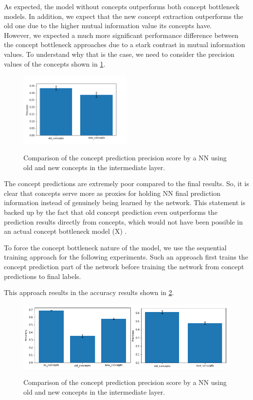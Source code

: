 As expected, the model without concepts outperforms both concept bottleneck models. 
In addition, we expect that the new concept extraction outperforms the old one due to the higher mutual information value its concepts have. \\
However, we expected a much more significant performance difference between the concept bottleneck approaches due to a stark contrast in mutual information values.
To understand why that is the case, we need to consider the precision values of the concepts shown in \ref{full-process-concept-precision}.

\begin{figure}[h]
\caption{Comparison of the concept prediction precision score by a NN using old and new concepts in the intermediate layer.}
\centering
\includegraphics[width=0.5\textwidth]{concept-bottleneck-pipeline/concept_precisions.png}
\label{full-process-concept-precision}
\end{figure}

The concept predictions are extremely poor compared to the final results.
So, it is clear that concepts serve more as proxies for holding NN final prediction information instead of genuinely being learned by the network.
This statement is backed up by the fact that old concept prediction even outperforms the prediction results directly from concepts, which would not have been possible in an actual concept bottleneck model (X) \cite{RefWorks:RefID:68-margeloiu2021concept}.

To force the concept bottleneck nature of the model, we use the sequential training approach for the following experiments.
Such an approach first trains the concept prediction part of the network before training the network from concept predictions to final labels.

This approach results in the accuracy results shown in \ref{seq-full-model-results}.

\begin{figure}[h]
\caption{Comparison of the concept prediction precision score by a NN using old and new concepts in the intermediate layer.}
\centering
\includegraphics[width=\textwidth]{concept-bottleneck-pipeline/seq_comparison.png}
\label{seq-full-model-results}
\end{figure}

